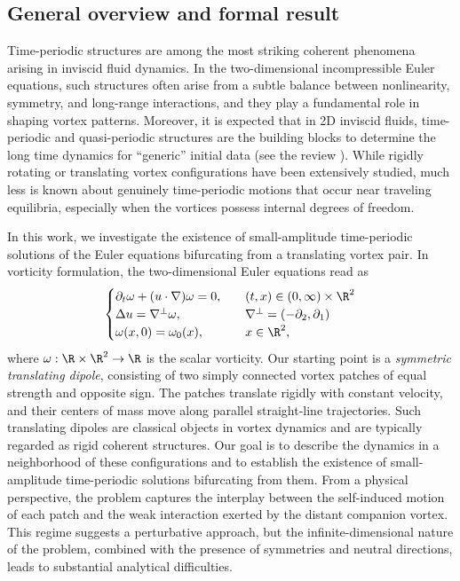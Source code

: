 \documentclass[a4paper,reqno,10pt]{article}
\begin{document}
\subsection{General overview and formal result}
Time-periodic structures    are among the most striking coherent phenomena arising in inviscid fluid dynamics. In the two-dimensional incompressible Euler equations, such structures often arise from a subtle balance between nonlinearity, symmetry, and long-range interactions, and they play a fundamental role in shaping  vortex patterns. Moreover, it is expected that in 2D inviscid fluids, time-periodic and quasi-periodic structures are the building blocks to determine the long time dynamics for ``generic'' initial data (see the review \cite{DE23}). While rigidly rotating or translating vortex configurations have been extensively studied, much less is known about genuinely time-periodic motions that occur near traveling equilibria, especially when the vortices possess internal degrees of freedom.

In this work, we investigate the existence of small-amplitude time-periodic solutions of the Euler equations bifurcating from a translating vortex pair. In  vorticity formulation, the two-dimensional Euler equations read as
\begin{align}\label{eq:Euler}
\begin{cases}
  \partial_t\omega+(u\cdot \nabla)\omega=0,\quad & (t,{x})\in (0,\infty)\times \R^2\\
  \Delta u=\nabla^{\perp}\omega,\quad & \nabla^\perp=(-\partial_2,\partial_1) \\
  \omega({x},0)=\omega_0({x}),\quad & {x}\in \R^2,
\end{cases}
\end{align}
where $\omega:\R\times \R^2 \to \R$ is the scalar vorticity.
Our starting point is a {\it symmetric translating dipole}, consisting of two simply connected vortex patches of equal strength and opposite sign. The patches translate rigidly with constant velocity, and their centers of mass move along parallel straight-line trajectories. Such translating dipoles are classical objects in vortex dynamics and are typically regarded as rigid coherent structures. Our goal is to describe the dynamics in a neighborhood of these configurations and to establish the existence of small-amplitude time-periodic solutions bifurcating from them. 
From a physical perspective, the problem captures the interplay between the self-induced motion of each patch and the weak interaction exerted by the distant companion vortex. 
This regime  suggests a perturbative approach, but the infinite-dimensional nature of the problem, combined with the presence of symmetries and neutral directions, leads to substantial analytical difficulties. 
\end{document}
